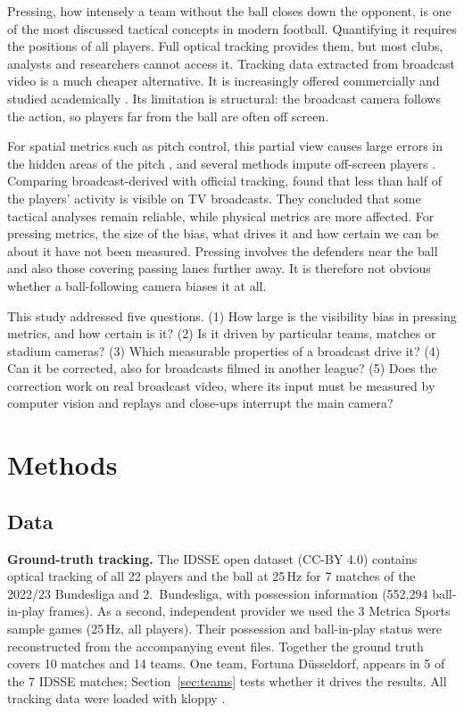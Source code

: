 \documentclass[11pt]{article}
\begin{document}
Pressing, how intensely a team without the ball closes down the opponent, is one of the most discussed tactical
concepts in modern football. Quantifying it requires the positions of all players. Full optical tracking provides
them, but most clubs, analysts and researchers cannot access it. Tracking data extracted from broadcast video is a much
cheaper alternative. It is increasingly offered commercially and studied academically
\citep{somers2024gsr,smf2025broadcast}. Its limitation is structural: the broadcast camera follows the action, so
players far from the ball are often off screen.

For spatial metrics such as pitch control, this partial view causes large errors in the hidden areas of the pitch
\citep{offscreen2026}, and several methods impute off-screen players
\citep{omidshafiei2022graphimputer,rsos2025continuous,offscreen2026}. Comparing broadcast-derived with official
tracking, \citet{smf2025broadcast} found that less than half of the players' activity is visible on TV broadcasts.
They concluded that some tactical analyses remain reliable, while physical metrics are more affected. For pressing
metrics, the size of the bias, what drives it and how certain we can be about it have not been measured. Pressing
involves the defenders near the ball and also those covering passing lanes further away. It is therefore not obvious
whether a ball-following camera biases it at all.

This study addressed five questions. (1) How large is the visibility bias in pressing metrics, and how certain is it?
(2) Is it driven by particular teams, matches or stadium cameras? (3) Which measurable properties of a broadcast drive
it? (4) Can it be corrected, also for broadcasts filmed in another league? (5) Does the correction work on real
broadcast video, where its input must be measured by computer vision and replays and close-ups interrupt the main
camera?

\section{Methods}

\subsection{Data}

\textbf{Ground-truth tracking.} The IDSSE open dataset \citep{bassek2025idsse} (CC-BY 4.0) contains optical tracking
of all 22 players and the ball at 25\,Hz for 7 matches of the 2022/23 Bundesliga and 2.~Bundesliga, with possession
information (552{,}294 ball-in-play frames). As a second, independent provider we used the 3 Metrica Sports sample
games \citep{metrica_sample} (25\,Hz, all players). Their possession and ball-in-play status were reconstructed from
the accompanying event files. Together the ground truth covers 10 matches and 14 teams. One team, Fortuna
D\"usseldorf, appears in 5 of the 7 IDSSE matches; Section~\ref{sec:teams} tests whether it drives the results. All
tracking data were loaded with kloppy \citep{kloppy}.
\end{document}
